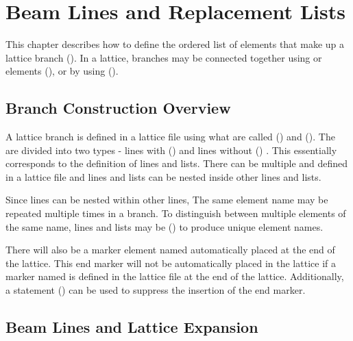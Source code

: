 \chapter{Beam Lines and Replacement Lists}
\label{c:sequence}

This chapter describes how to define the ordered list of elements that make up a lattice branch
().  In a lattice, branches may be connected together using  or
 elements (), or by using  ().

\section{Branch Construction Overview}
\label{s:branch.construct}

A lattice branch is defined in a lattice file using what are called 
() and  ().  The  are
divided into two types - lines with () and lines without
() . This essentially corresponds to the \mad
definition of lines and lists. There can be multiple  and 
defined in a lattice file and lines and lists can be nested inside other lines and lists.

Since lines can be nested within other lines, The same element name may be repeated multiple times
in a branch. To distinguish between multiple elements of the same name, lines and lists may be
 () to produce unique element names.

There will also be a marker element named  automatically placed at the end of the
lattice. This end marker will not be automatically placed in the lattice if a marker named 
is defined in the lattice file at the end of the lattice. Additionally, a
 statement () can be used to suppress the insertion of
the end marker.

\section{Beam Lines and Lattice Expansion}
\label{s:lines.wo.arg}


